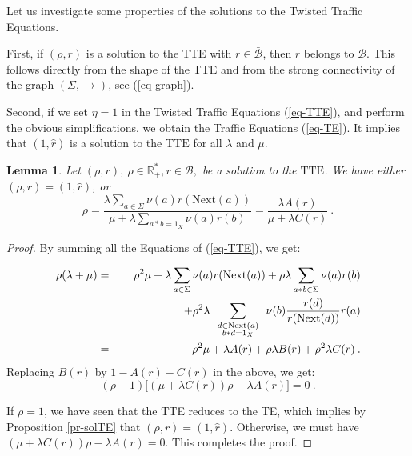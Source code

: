 \documentclass[11pt,a4paper]{article}
\newcommand{\bdl}[2]
{\mbox{$
\renewcommand{\arraystretch}{0.5}
\begin{array}{c}{\scriptstyle #1}\\ {\scriptstyle #2} \end{array}
\renewcommand{\arraystretch}{2}
       $}}
\newtheorem{lemma}[theorem]{Lemma}
\theoremstyle{remark}
\def\Blackboardfont{\mathbb}
\def\rig{\text{Next}}
\def\lef{\text{Next}}
\def\cb{\cB}
\def\closcb{\bar{\cB}}
\def\R{{\Blackboardfont R}}
\def\cB{{\mathcal B}}
\def\eref#1{(\ref{#1})}
\begin{document}
\medskip

Let us investigate some properties of the solutions to the
Twisted Traffic Equations.

\medskip

First, if $(\rho,r)$ is a solution to the TTE with $r\in \closcb$,
then $r$ belongs to $\cB$. This follows directly from the shape of
the TTE and from the strong connectivity of the graph
$(\Sigma,\rightarrow)$, see \eref{eq-graph}. 

Second, if we set $\eta=1$ in the Twisted Traffic Equations \eref{eq-TTE}, and perform the obvious
simplifications, we obtain the Traffic Equations \eref{eq-TE}.
It implies that $(1,\widehat{r})$ is a solution to the $\text{TTE}$ for
all $\lambda$ and $\mu$.

\begin{lemma}\label{le-tte1}
Let $(\rho,r), \ \rho \in \R_+^*, r\in \cb,$ be a solution to the
$\text{TTE}$. We have either $(\rho,r)=(1,\widehat{r})$, or
\begin{equation}\label{eq-etax}
\rho=\frac{\lambda\sum_{a\in \Sigma} \nu(a)r(\rig(a))}{\mu +
\lambda \sum_{a\ast b =1_X} \nu(a)r(b)} = \frac{\lambda A(r)}{\mu
+
  \lambda C(r)}\:.
\end{equation}
\end{lemma}

\begin{proof}
By summing all the Equations of \eref{eq-TTE}, we get:

\begin{eqnarray*}
\rho(\lambda+\mu) & = & \rho^2\mu + \lambda \sum_{a\in
\Sigma}\nu(a) r(\rig(a)) + \rho \lambda \sum_{
a*b \in \Sigma} \nu(a)r(b) \\
&& \hspace*{2cm} + \rho^2\lambda \sum_{\bdl{d\in
    \lef(a)}{b\ast d=1_X}} \nu(b)\frac{r(d)}{r(\rig(d))} r(a)
\\
& = & \rho^2\mu + \lambda A(r) + \rho\lambda B(r) + \rho^2\lambda
C(r) \:.
\end{eqnarray*}
Replacing $B(r)$ by $1-A(r)-C(r)$ in the above, we get:
\begin{equation}\label{23}
(\rho - 1)\bigl[ (\mu+\lambda C(r))\rho - \lambda A(r)\bigr] = 0 \:.
\end{equation}

If $\rho=1$, we have seen that the TTE reduces to the TE, which implies by
Proposition \ref{pr-solTE} that $(\rho,r)=(1,\widehat{r})$. Otherwise, we must have
$(\mu+\lambda C(r))\rho - \lambda A(r)=0$. This completes the
proof.
\end{proof}
\end{document}
